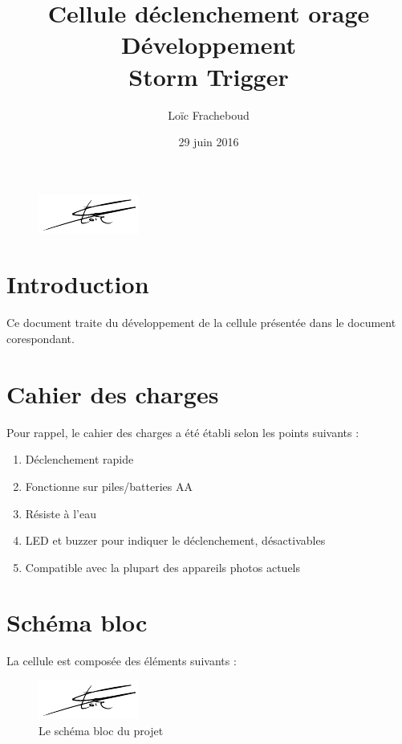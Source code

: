 \documentclass[a4paper,10pt]{article}
\author{Loïc Fracheboud}
\title{Cellule déclenchement orage \\ Développement \\ \Huge Storm Trigger}
\date{29 juin 2016}
\begin{document}
 \maketitle

 \begin{figure}[!h]
 \centering
 \vspace{80pt}
 \includegraphics[scale=0.2]{images/signfracheboud}
 \end{figure}
 \pagebreak
 
 \section{Introduction}
 Ce document traite du développement de la cellule présentée dans le document corespondant. \\

  \section{Cahier des charges}
  Pour rappel, le cahier des charges a été établi selon les points suivants :
  \begin{enumerate}
    \item Déclenchement rapide
    \item Fonctionne sur piles/batteries AA
    \item Résiste à l'eau
    \item LED et buzzer pour indiquer le déclenchement, désactivables
    \item Compatible avec la plupart des appareils photos actuels
    \end{enumerate}  
  
  \section{Schéma bloc}
  La cellule est composée des éléments suivants :  
  
 \begin{figure}[!h]
 \centering
 \includegraphics[scale=0.32]{images/signfracheboud}
 \caption{Le schéma bloc du projet}
 \end{figure}
\end{document}
